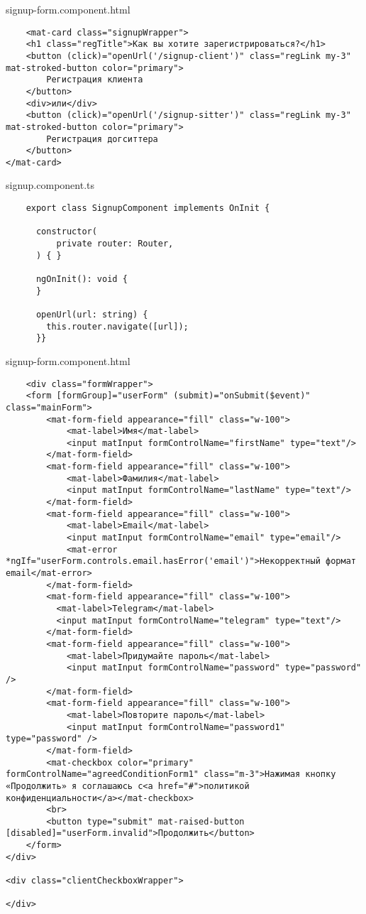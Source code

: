 signup-form.component.html
\begin{lstlisting}
    <mat-card class="signupWrapper">
    <h1 class="regTitle">Как вы хотите зарегистрироваться?</h1>
    <button (click)="openUrl('/signup-client')" class="regLink my-3" mat-stroked-button color="primary">
        Регистрация клиента
    </button>
    <div>или</div>
    <button (click)="openUrl('/signup-sitter')" class="regLink my-3" mat-stroked-button color="primary">
        Регистрация догситтера
    </button>
</mat-card>
\end{lstlisting}

signup.component.ts
\begin{lstlisting}
    export class SignupComponent implements OnInit {
    
      constructor(
          private router: Router,
      ) { }
    
      ngOnInit(): void {
      }
    
      openUrl(url: string) {
        this.router.navigate([url]);
      }}
\end{lstlisting}

signup-form.component.html
\begin{lstlisting}
    <div class="formWrapper">
    <form [formGroup]="userForm" (submit)="onSubmit($event)" class="mainForm">
        <mat-form-field appearance="fill" class="w-100">
            <mat-label>Имя</mat-label>
            <input matInput formControlName="firstName" type="text"/>
        </mat-form-field>
        <mat-form-field appearance="fill" class="w-100">
            <mat-label>Фамилия</mat-label>
            <input matInput formControlName="lastName" type="text"/>
        </mat-form-field>
        <mat-form-field appearance="fill" class="w-100">
            <mat-label>Email</mat-label>
            <input matInput formControlName="email" type="email"/>
            <mat-error *ngIf="userForm.controls.email.hasError('email')">Некорректный формат email</mat-error>
        </mat-form-field>
        <mat-form-field appearance="fill" class="w-100">
          <mat-label>Telegram</mat-label>
          <input matInput formControlName="telegram" type="text"/>
        </mat-form-field>
        <mat-form-field appearance="fill" class="w-100">
            <mat-label>Придумайте пароль</mat-label>
            <input matInput formControlName="password" type="password" />
        </mat-form-field>
        <mat-form-field appearance="fill" class="w-100">
            <mat-label>Повторите пароль</mat-label>
            <input matInput formControlName="password1" type="password" />
        </mat-form-field>
        <mat-checkbox color="primary" formControlName="agreedConditionForm1" class="m-3">Нажимая кнопку «Продолжить» я соглашаюсь с<a href="#">политикой конфиденциальности</a></mat-checkbox>
        <br>
        <button type="submit" mat-raised-button [disabled]="userForm.invalid">Продолжить</button>
    </form>
</div>

<div class="clientCheckboxWrapper">

</div>
\end{lstlisting}


